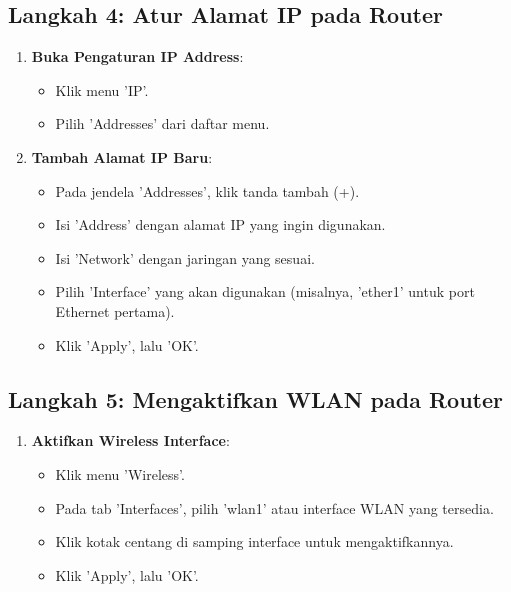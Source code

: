 \subsection*{Langkah 4: Atur Alamat IP pada Router}
\begin{enumerate}
    \item \textbf{Buka Pengaturan IP Address}:
    \begin{itemize}
        \item Klik menu 'IP'.
        \item Pilih 'Addresses' dari daftar menu.
    \end{itemize}
    
    \item \textbf{Tambah Alamat IP Baru}:
    \begin{itemize}
        \item Pada jendela 'Addresses', klik tanda tambah (+).
        \item Isi 'Address' dengan alamat IP yang ingin digunakan.
        \item Isi 'Network' dengan jaringan yang sesuai.
        \item Pilih 'Interface' yang akan digunakan (misalnya, 'ether1' untuk port Ethernet pertama).
        \item Klik 'Apply', lalu 'OK'.
    \end{itemize}
\end{enumerate}

\subsection*{Langkah 5: Mengaktifkan WLAN pada Router}
\begin{enumerate}
    \item \textbf{Aktifkan Wireless Interface}:
    \begin{itemize}
        \item Klik menu 'Wireless'.
        \item Pada tab 'Interfaces', pilih 'wlan1' atau interface WLAN yang tersedia.
        \item Klik kotak centang di samping interface untuk mengaktifkannya.
        \item Klik 'Apply', lalu 'OK'.
    \end{itemize}
\end{enumerate}

